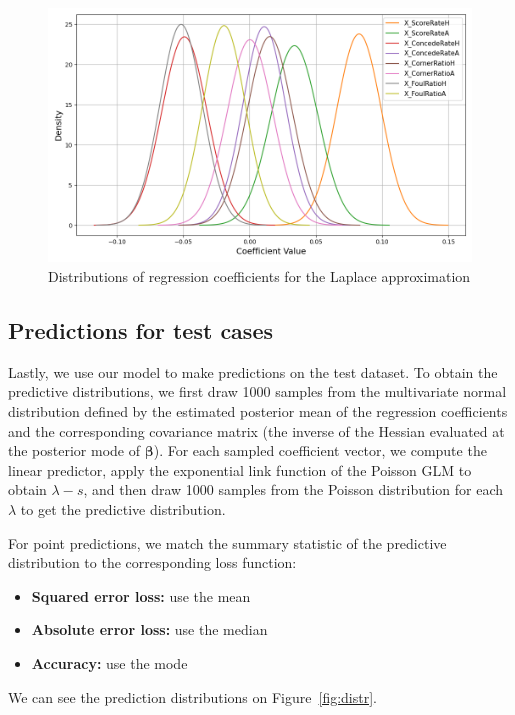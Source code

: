 \documentclass[9pt]{IEEEtran}
\begin{document}
\begin{figure}[h]
\centering
\includegraphics[width=1\columnwidth]{figures/approximation.png}
\caption{Distributions of regression coefficients for the Laplace approximation}
\label{fig:approx}
\end{figure}

\subsection{Predictions for test cases}
Lastly, we use our model to make predictions on the test dataset. 
To obtain the predictive distributions, we first draw 1000 samples from the
 multivariate normal distribution defined by the estimated posterior mean of 
 the regression coefficients and the corresponding covariance matrix (the inverse
  of the Hessian evaluated at the posterior mode of $\boldsymbol{\beta}$). For
   each sampled coefficient vector, we compute the linear predictor, apply the 
   exponential link function of the Poisson GLM to obtain $\lambda-s$, and then draw
    1000 samples from the Poisson distribution for each $\lambda$ to get
     the predictive distribution.

For point predictions, we match the summary statistic of the predictive distribution to the corresponding loss function:
\begin{itemize}
    \item \textbf{Squared error loss:} use the  mean
    \item \textbf{Absolute error loss:} use the median
    \item \textbf{Accuracy:} use the mode 
\end{itemize}

We can see the prediction distributions on Figure~\ref{fig:distr}.
\end{document}
